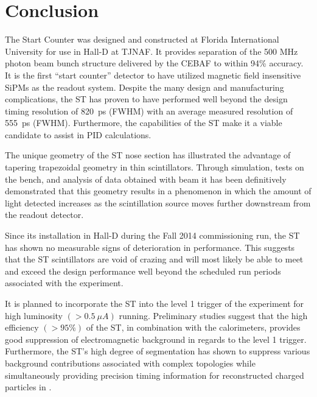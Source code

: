 \section{Conclusion} \label{sec:conclusion}

The \gx{} Start Counter was designed and constructed at Florida International University for use in Hall-D at TJNAF. It provides separation of the 500 MHz photon beam bunch structure delivered by the CEBAF to within 94\% accuracy.  It is the first ``start counter'' detector to have utilized magnetic field insensitive SiPMs as the readout system.  Despite the many design and manufacturing complications, the ST has proven to have performed well beyond the design timing resolution of 820~ps (FWHM) with an average measured resolution of 555~ps (FWHM).  Furthermore, the capabilities of the ST make it a viable candidate to assist in PID calculations.

The unique geometry of the ST nose section has illustrated the advantage of tapering trapezoidal geometry in thin scintillators.  Through simulation, tests on the bench, and analysis of data obtained with beam it has been definitively demonstrated that this geometry results in a phenomenon in which the amount of light detected increases as the scintillation source moves further downstream from the readout detector.

Since its installation in Hall-D during the Fall 2014 commissioning run, the ST has shown no measurable signs of deterioration in performance.  This suggests that the ST scintillators are void of crazing and will most likely be able to meet and exceed the design performance well beyond the scheduled run periods associated with the \gx{} experiment.

It is planned to incorporate the ST into the level 1 trigger of the \gx{} experiment for high luminosity $(> 0.5\ \mu A)$ running.  Preliminary studies suggest that the high efficiency $(> 95\%)$ of the ST, in combination with the calorimeters, provides good suppression of electromagnetic background in regards to the level 1 trigger.  Furthermore, the ST's high degree of segmentation has shown to suppress various background contributions associated with complex topologies while simultaneously providing precision timing information for reconstructed charged particles in \gx{}.